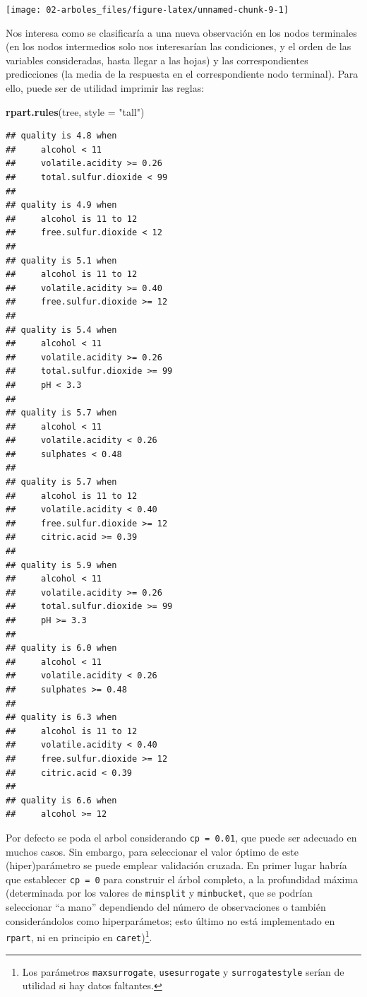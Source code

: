 \documentclass[
]{book}
\newenvironment{Shaded}{\begin{snugshade}}{\end{snugshade}}
\newcommand{\DataTypeTok}[1]{\textcolor[rgb]{0.13,0.29,0.53}{#1}}
\newcommand{\KeywordTok}[1]{\textcolor[rgb]{0.13,0.29,0.53}{\textbf{#1}}}
\newcommand{\NormalTok}[1]{#1}
\newcommand{\StringTok}[1]{\textcolor[rgb]{0.31,0.60,0.02}{#1}}
\theoremstyle{break}
\theoremstyle{definition}
\theoremstyle{definition}
\theoremstyle{definition}
\theoremstyle{remark}
\begin{document}
\begin{center}\texttt{[image: 02-arboles\_files/figure-latex/unnamed-chunk-9-1]} \end{center}

Nos interesa como se clasificaría a una nueva observación en los nodos terminales (en los nodos intermedios solo nos interesarían las condiciones, y el orden de las variables consideradas, hasta llegar a las hojas) y las correspondientes predicciones (la media de la respuesta en el correspondiente nodo terminal).
Para ello, puede ser de utilidad imprimir las reglas:

\begin{Shaded}
\begin{Highlighting}[]
\KeywordTok{rpart.rules}\NormalTok{(tree, }\DataTypeTok{style =} \StringTok{"tall"}\NormalTok{)}
\end{Highlighting}
\end{Shaded}

\begin{verbatim}
## quality is 4.8 when
##     alcohol < 11
##     volatile.acidity >= 0.26
##     total.sulfur.dioxide < 99
## 
## quality is 4.9 when
##     alcohol is 11 to 12
##     free.sulfur.dioxide < 12
## 
## quality is 5.1 when
##     alcohol is 11 to 12
##     volatile.acidity >= 0.40
##     free.sulfur.dioxide >= 12
## 
## quality is 5.4 when
##     alcohol < 11
##     volatile.acidity >= 0.26
##     total.sulfur.dioxide >= 99
##     pH < 3.3
## 
## quality is 5.7 when
##     alcohol < 11
##     volatile.acidity < 0.26
##     sulphates < 0.48
## 
## quality is 5.7 when
##     alcohol is 11 to 12
##     volatile.acidity < 0.40
##     free.sulfur.dioxide >= 12
##     citric.acid >= 0.39
## 
## quality is 5.9 when
##     alcohol < 11
##     volatile.acidity >= 0.26
##     total.sulfur.dioxide >= 99
##     pH >= 3.3
## 
## quality is 6.0 when
##     alcohol < 11
##     volatile.acidity < 0.26
##     sulphates >= 0.48
## 
## quality is 6.3 when
##     alcohol is 11 to 12
##     volatile.acidity < 0.40
##     free.sulfur.dioxide >= 12
##     citric.acid < 0.39
## 
## quality is 6.6 when
##     alcohol >= 12
\end{verbatim}

Por defecto se poda el arbol considerando \texttt{cp\ =\ 0.01}, que puede ser adecuado en muchos casos.
Sin embargo, para seleccionar el valor óptimo de este (hiper)parámetro se puede emplear validación cruzada.
En primer lugar habría que establecer \texttt{cp\ =\ 0} para construir el árbol completo, a la profundidad máxima
(determinada por los valores de \texttt{minsplit} y \texttt{minbucket}, que se podrían seleccionar
``a mano'' dependiendo del número de observaciones o también considerándolos como hiperparámetos; esto último no está implementado en \texttt{rpart}, ni en principio en \texttt{caret})\footnote{Los parámetros \texttt{maxsurrogate}, \texttt{usesurrogate} y \texttt{surrogatestyle} serían de utilidad si hay datos faltantes.}.
\end{document}
